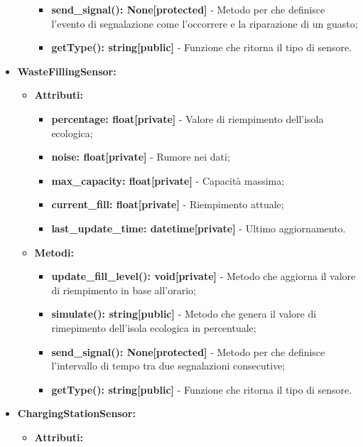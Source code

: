 \documentclass[8pt]{article}
\begin{document}
\begin{itemize}
\begin{itemize}
\begin{itemize}
            \item \textbf{send\_signal(): None[protected]} - Metodo per che definisce l'evento di segnalazione come l'occorrere e la riparazione di un guasto;
            \item \textbf{getType(): string[public]} - Funzione che ritorna il tipo di sensore.
        \end{itemize}
    \end{itemize}
    \item \textbf{WasteFillingSensor:}
    \begin{itemize}
	\setlength\itemsep{0em}
        \item \textbf{Attributi:}
        \begin{itemize}
	\setlength\itemsep{0em}
            \item \textbf{percentage: float[private]} - Valore di riempimento dell'isola ecologica;
            \item \textbf{noise: float[private]} - Rumore nei dati;
            \item \textbf{max\_capacity: float[private]} - Capacità massima;
            \item \textbf{current\_fill: float[private]} - Riempimento attuale;
            \item \textbf{last\_update\_time: datetime[private]} - Ultimo aggiornamento.
        \end{itemize}
        \item \textbf{Metodi:}
        \begin{itemize}
	\setlength\itemsep{0em}
            \item \textbf{update\_fill\_level(): void[private]} - Metodo che aggiorna il valore di riempimento in base all'orario;
            \item \textbf{simulate(): string[public]} - Metodo che genera il valore di rimepimento dell'isola ecologica in percentuale;
            \item \textbf{send\_signal(): None[protected]} - Metodo per che definisce l'intervallo di tempo tra due segnalazioni consecutive;
            \item \textbf{getType(): string[public]} - Funzione che ritorna il tipo di sensore.
        \end{itemize}
    \end{itemize}
    \item \textbf{ChargingStationSensor:}
    \begin{itemize}
	\setlength\itemsep{0em}
        \item \textbf{Attributi:}

\end{itemize}
\end{itemize}
\end{document}
